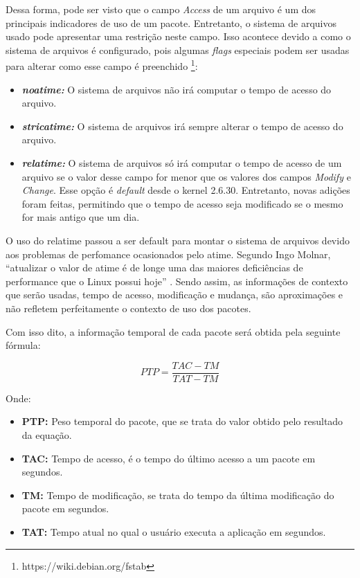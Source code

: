 Dessa forma, pode ser visto que o campo \textit{Access} de um arquivo é um dos
principais indicadores de uso de um pacote. Entretanto, o sistema de arquivos
usado pode apresentar uma
restrição neste campo. Isso acontece devido a como o sistema de arquivos é
configurado, pois algumas \textit{flags} especiais podem ser usadas para alterar como
esse campo é preenchido \footnote{https://wiki.debian.org/fstab}:

\begin{itemize}
    \item \textit{\textbf{noatime:}} O sistema de arquivos não irá computar o tempo de
        acesso do arquivo.
    \item \textit{\textbf{stricatime:}} O sistema de arquivos irá sempre alterar o tempo
        de acesso do arquivo.
    \item \textit{\textbf{relatime:}} O sistema de arquivos só irá computar o tempo de
        acesso de um arquivo se o valor desse campo for menor que os valores dos
        campos \textit{Modify} e \textit{Change}. Esse opção é \textit{default} desde
        o kernel 2.6.30. Entretanto, novas adições foram feitas, permitindo que
        o tempo de acesso seja modificado se o mesmo for mais antigo que um dia.
\end{itemize}

O uso do relatime passou a ser default para montar o sistema de arquivos devido
aos problemas de perfomance ocasionados pelo atime. Segundo Ingo Molnar,
``atualizar o valor de atime é de longe uma das maiores deficiências de
performance que o Linux possui hoje'' \cite{3_corbet_2007}. Sendo assim, as
informações de contexto que serão usadas, tempo de acesso, modificação e
mudança, são aproximações e não refletem perfeitamente o contexto de uso dos
pacotes.

Com isso dito, a informação temporal de cada pacote será obtida pela seguinte
fórmula:

\begin{equation} \label{eq:peso_temporal_do_pacote}
PTP = \frac{TAC - TM}{TAT - TM}
\end{equation}

Onde:

\begin{itemize}
    \item \textbf{PTP:} Peso temporal do pacote, que se trata do valor obtido
    pelo resultado da equação.
    \item \textbf{TAC:} Tempo de acesso, é o tempo do último acesso a um pacote
    em segundos.
    \item \textbf{TM:} Tempo de modificação, se trata do tempo da última
    modificação do pacote em segundos.
    \item \textbf{TAT:} Tempo atual no qual o usuário executa a
        aplicação em segundos.
\end{itemize}


